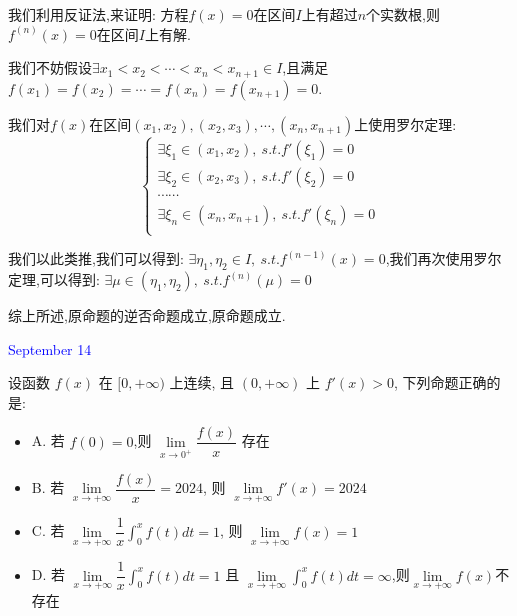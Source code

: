 \begin{solution}

	我们利用反证法,来证明:  方程$f(x)=0$在区间$I$上有超过$n$个实数根,则$f^{(n)}(x)=0$在区间$I$上有解.
	
	我们不妨假设$\exists x_{1}<x_{2}<\cdots<x_{n}<x_{n+1}\in I$,且满足$f(x_{1})=f(x_{2})=\cdots=f(x_{n})=f(x_{n+1})=0$.
	
	我们对$f(x)$在区间$(x_{1},x_{2}),(x_{2},x_{3}),\cdots,(x_{n},x_{n+1})$上使用罗尔定理:  
	$$\left\lbrace
	\begin{array}{l}
		\exists \xi_{1}\in(x_{1},x_{2}),\ s.t. f'(\xi_{1})=0\\
		\exists \xi_{2}\in(x_{2},x_{3}),\ s.t. f'(\xi_{2})=0\\
		\cdots\cdots\\
		\exists \xi_{n}\in(x_{n},x_{n+1}),\ s.t. f'(\xi_{n})=0\\	
	\end{array}
	\right. $$
	
	我们以此类推,我们可以得到:  $\exists\eta_{1},\eta_{2}\in I,\ s.t. f^{(n-1)}(x)=0$,我们再次使用罗尔定理,可以得到:  
	$\exists \mu\in(\eta_{1},\eta_{2}),\ s.t. f^{(n)}(\mu)=0$
	
	综上所述,原命题的逆否命题成立,原命题成立.
\end{solution}


\textcolor{blue}{September 14}

\begin{example}[][Exam: 35.2.13]
	设函数 $f(x)$ 在 $[0,+\infty)$ 上连续, 且 $(0,+\infty)$ 上 $f'(x)>0$, 下列命题正确的是:  
\begin{itemize}
	\item A. 若 $f(0)=0$,则 $\lim\limits_{x\to 0^{+}}\dfrac{f(x)}{x}$ 存在
	\item B. 若 $\lim\limits_{x\to+\infty}\dfrac{f(x)}{x}=2024$, 则 $\lim\limits_{x\to +\infty}f'(x)=2024$
	\item C. 若 $\lim\limits_{x\to+\infty}\dfrac{1}{x}\int_{0}^{x}f(t)dt=1$, 则 $\lim\limits_{x\to +\infty}f(x)=1$
	\item D. 若 $\lim\limits_{x\to+\infty}\dfrac{1}{x}\int_{0}^{x}f(t)dt=1$ 且 $\lim\limits_{x\to+\infty}\int_{0}^{x}f(t)dt=\infty$,则$\lim\limits_{x\to+\infty}f(x)$不存在
\end{itemize}
\end{example}

